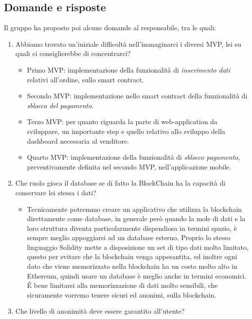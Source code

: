 \subsection{Domande e risposte}
Il gruppo ha proposto poi alcune domande al responsabile, tra le quali:
\begin{enumerate}
    \item Abbiamo trovato un'iniziale difficoltà nell'immaginarci i diversi MVP, lei su quali ci consiglierebbe di concentrarci?
          \begin{itemize}
              \item Primo MVP: implementazione della funzionalità di \textit{inserimento dati} relativi all'ordine, sullo smart contract.
              \item Secondo MVP: implementazione nello smart contract della funzionalità di \textit{sblocco del pagamento}.
              \item Terzo MVP: per quanto riguarda la parte di web-application da sviluppare, un importante step e quello relativo allo sviluppo della
                    dashboard necessaria al venditore.
              \item Quarto MVP: implementazione della funzionalità di \textit{sblocco pagamento}, preventivamente definita nel secondo MVP, nell'applicazione
                    mobile.
            \end{itemize}
    \item Che ruolo gioca il database se di fatto la BlockChain ha la capacità di conservare lei stessa i dati?
            \begin{itemize}
                \item Tecnicamente potremmo creare un applicativo che utilizza la blockchain direttamente come database, in generale però quando la mole di dati
                      e la loro struttura diventa particolarmente dispendiosa in termini spazio, è sempre meglio appoggiarsi ad un database esterno. 
                      Proprio lo stesso linguaggio Solidity mette a disposizione un set di tipo dati molto limitato, questo per evitare che la blockchain venga appesantita, ed
                      inoltre ogni dato che viene memorizzato nella blockchain ha un costo molto alto in Ethereum, quindi usare un database è meglio anche in termini economici.
                      \'E bene limitarsi alla memorizzazione di dati molto sensibili, che sicuramente vorremo tenere sicuri ed anonimi, sulla blockchain.
            \end{itemize}
    \item Che livello di anonimità deve essere garantito all'utente?

\end{enumerate}

